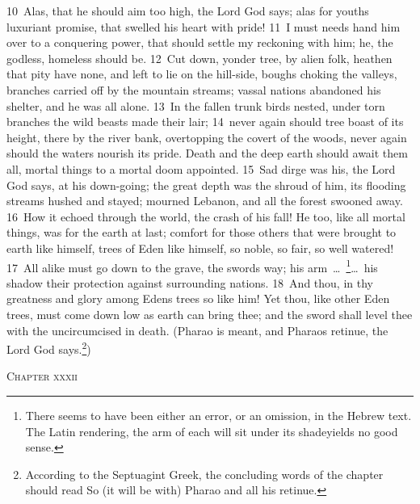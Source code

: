 \documentclass[10pt]{book} %
\begin{document}
\textcolor{benred8}{10}~Alas, that he should aim too high, the Lord God says; alas for youth\textquotesingle s luxuriant promise, that swelled his heart with pride! \textcolor{benred8}{11}~I must needs hand him over to a conquering power, that should settle my reckoning with him; he, the godless, homeless should be. \textcolor{benred8}{12}~Cut down, yonder tree, by alien folk, heathen that pity have none, and left to lie on the hill-side, boughs choking the valleys, branches carried off by the mountain streams; vassal nations abandoned his shelter, and he was all alone. \textcolor{benred8}{13}~In the fallen trunk birds nested, under torn branches the wild beasts made their lair; \textcolor{benred8}{14}~never again should tree boast of its height, there by the river bank, overtopping the covert of the woods, never again should the waters nourish its pride. Death and the deep earth should await them all, mortal things to a mortal doom appointed.
\textcolor{benred8}{15}~Sad dirge was his, the Lord God says, at his down-going; the great depth was the shroud of him, its flooding streams hushed and stayed; mourned Lebanon, and all the forest swooned away. \textcolor{benred8}{16}~How it echoed through the world, the crash of his fall! He too, like all mortal things, was for the earth at last; comfort for those others that were brought to earth like himself, trees of Eden like himself, so noble, so fair, so well watered! \textcolor{benred8}{17}~All alike must go down to the grave, the sword\textquotesingle s way; his arm~\ldots\ \footnote[3]{There seems to have been either an error, or an omission, in the Hebrew text. The Latin rendering, \textasciigrave the arm of each will sit under its shade\textquotesingle  yields no good sense.}\ldots\  his shadow their protection against surrounding nations. \textcolor{benred8}{18}~And thou, in thy greatness and glory among Eden\textquotesingle s trees so like him! Yet thou, like other Eden trees, must come down low as earth can bring thee; and the sword shall level thee with the uncircumcised in death. (Pharao is meant, and Pharao\textquotesingle s retinue, the Lord God says.\footnote[4]{According to the Septuagint Greek, the concluding words of the chapter should read \textasciigrave So (it will be with) Pharao and all his retinue\textquotesingle .})
\begin{large}\begin{center}\textsc{Chapter xxxii}\end{center}\end{large}
\end{document}
